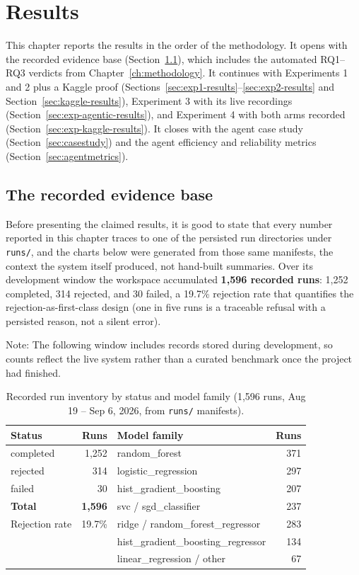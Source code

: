 \chapter{Results}
\label{ch:results}

This chapter reports the results in the order of the methodology. It opens with the recorded evidence base (Section~\ref{sec:evidence}), which includes the automated RQ1--RQ3 verdicts from Chapter~\ref{ch:methodology}. It continues with Experiments 1 and 2 plus a Kaggle proof (Sections~\ref{sec:exp1-results}--\ref{sec:exp2-results} and Section~\ref{sec:kaggle-results}), Experiment 3 with its live recordings (Section~\ref{sec:exp-agentic-results}), and Experiment 4 with both arms recorded (Section~\ref{sec:exp-kaggle-results}). It closes with the agent case study (Section~\ref{sec:casestudy}) and the agent efficiency and reliability metrics (Section~\ref{sec:agentmetrics}).

\section{The recorded evidence base}
\label{sec:evidence}

Before presenting the claimed results, it is good to state that every number reported in this chapter traces to one of the persisted run directories under \texttt{runs/}, and the charts below were generated from those same manifests, the context the system itself produced, not hand-built summaries. Over its development window the workspace accumulated \textbf{1{,}596 recorded runs}: 1{,}252 completed, 314 rejected, and 30 failed, a 19.7\% rejection rate that quantifies the rejection-as-first-class design (one in five runs is a traceable refusal with a persisted reason, not a silent error).

Note: The following window includes records stored during development, so counts reflect the live system rather than a curated benchmark once the project had finished.

\begin{table}[H]
\centering
\caption{Recorded run inventory by status and model family (1{,}596 runs, Aug 19 -- Sep 6, 2026, from \texttt{runs/} manifests).}
\label{tab:runinventory}
\small
\begin{tabular}{lr lr}
\toprule
\textbf{Status} & \textbf{Runs} & \textbf{Model family} & \textbf{Runs} \\
\midrule
completed & 1{,}252 & random\_forest & 371 \\
rejected & 314 & logistic\_regression & 297 \\
failed & 30 & hist\_gradient\_boosting & 207 \\
\midrule
\textbf{Total} & \textbf{1{,}596} & svc / sgd\_classifier & 237 \\
Rejection rate & 19.7\% & ridge / random\_forest\_regressor & 283 \\
 & & hist\_gradient\_boosting\_regressor & 134 \\
 & & linear\_regression / other & 67\\
\bottomrule
\end{tabular}
\end{table}


